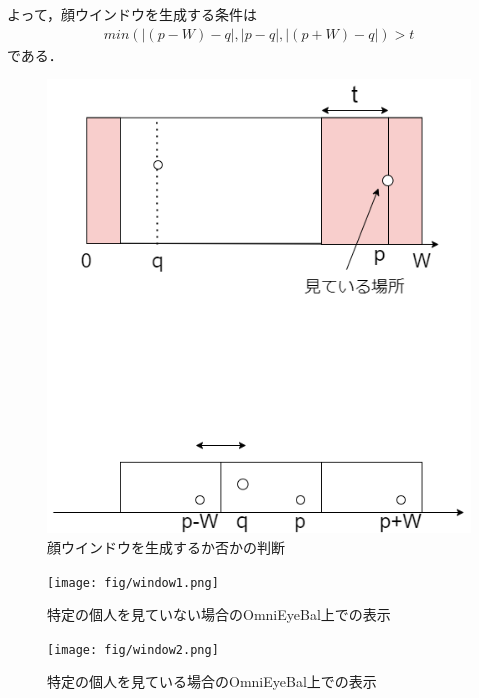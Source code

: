 よって，顔ウインドウを生成する条件は
\begin{eqnarray}
  min(|(p-W)-q|,|p-q|,|(p+W)-q|) > t \nonumber 
\end{eqnarray}
である．

\begin{figure}[tp]
  \centering
  \includegraphics[scale=0.7]{fig/App1_imp.png}
  \caption{顔ウインドウを生成するか否かの判断}\label{App1}
\end{figure}

\begin{figure}[p]
  \centering
  \texttt{[image: fig/window1.png]}
  \caption{特定の個人を見ていない場合のOmniEyeBal上での表示}
\end{figure}

\begin{figure}[p]
  \centering
  \texttt{[image: fig/window2.png]}
  \caption{特定の個人を見ている場合のOmniEyeBal上での表示}
\end{figure}


